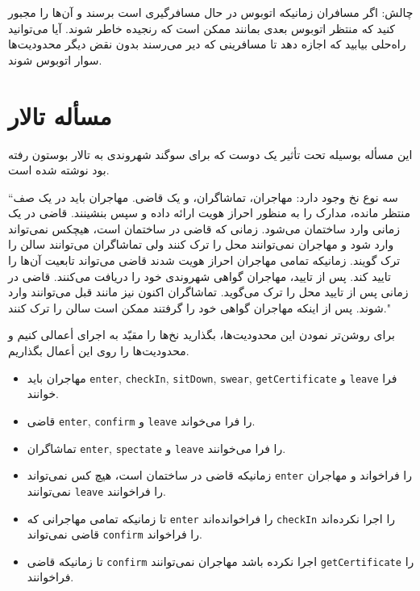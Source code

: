 \documentclass{book}
\newcommand{\clearemptydoublepage}{}%
\begin{document}
    چالش: اگر مسافران زمانیکه اتوبوس در حال مسافرگیری است برسند و آن‌ها را مجبور کنید که منتظر اتوبوس بعدی بمانند ممکن است که رنجیده خاطر شوند. 
    آیا می‌توانید راه‌حلی بیابید که اجازه دهد تا مسافرینی که دیر می‌رسند بدون نقض دیگر محدودیت‌ها سوار اتوبوس شوند. 
    


\clearemptydoublepage
\section{مسأله تالار }

    این مسأله بوسیله  تحت تأثیر یک دوست که  برای سوگند شهروندی به تالار   بوستون رفته بود نوشته شده است.

    ``سه نوع نخ وجود دارد: مهاجران، تماشاگران، و یک قاضی. مهاجران باید در یک صف منتظر مانده، مدارک را به منظور احراز هویت ارائه داده  و سپس بنشینند. 
    قاضی در یک زمانی وارد ساختمان می‌شود. زمانی که قاضی در ساختمان است، هیچکس نمی‌تواند وارد شود و مهاجران نمی‌توانند محل را ترک کنند ولی 
    تماشاگران می‌توانند سالن را ترک گویند. زمانیکه تمامی مهاجران احراز هویت شدند قاضی می‌تواند تابعیت آن‌ها را تایید کند. پس از تایید، مهاجران 
    گواهی شهروندی خود را دریافت می‌کنند. قاضی در زمانی پس از تایید محل را ترک می‌گوید. تماشاگران اکنون نیز مانند قبل می‌توانند وارد شوند. 
    پس از اینکه مهاجران گواهی‌ خود را گرفتند ممکن است سالن را ترک کنند." 

    برای روشن‌تر نمودن این محدودیت‌ها، بگذارید نخ‌ها را مقیّد به اجرای أعمالی کنیم و محدودیت‌ها را روی این أعمال بگذاریم. 

\begin{itemize}

\item
    مهاجران باید {\tt enter}, {\tt checkIn}, {\tt sitDown}, {\tt swear}, {\tt getCertificate} و {\tt leave} 
    فرا خوانند. 

\item
    قاضی {\tt enter}, {\tt confirm} و {\tt leave}  را فرا می‌خواند. 

\item
    تماشاگران {\tt enter}, {\tt spectate} و {\tt leave} را فرا می‌خوانند. 

\item
    زمانیکه قاضی در ساختمان است، هیچ کس نمی‌تواند {\tt enter} را فراخواند و مهاجران نمی‌توانند  {\tt leave} را فراخوانند. 

\item
    تا زمانیکه تمامی مهاجرانی که {\tt enter} را فراخوانده‌اند  {\tt checkIn} را  اجرا نکرده‌اند  قاضی نمی‌تواند  {\tt confirm} را فراخواند.

\item
    تا زمانیکه قاضی {\tt confirm} اجرا نکرده باشد مهاجران نمی‌توانند {\tt getCertificate} را فراخوانند. 

\end{itemize}
\end{document}
